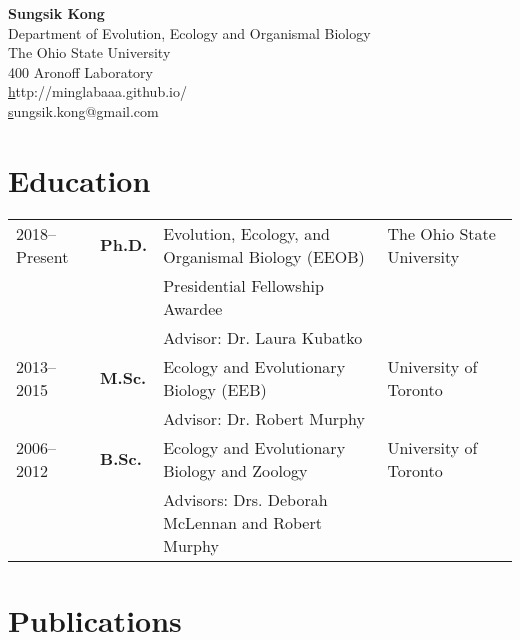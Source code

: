 \documentclass[11pt]{article}
\begin{document}
\pagestyle{plain}

\begin{center}
\huge \textbf{Sungsik Kong}\\
\vspace{0.2cm}
\large Department of Evolution, Ecology and Organismal Biology\\
\large The Ohio State University\\
\large 400 Aronoff Laboratory\\
\small \href{http://minglabaaa.github.io}http://minglabaaa.github.io/\\
\small \href{mailto:sungsik.kong@gmail.com}sungsik.kong@gmail.com
\end{center}




\hspace{0pt}




\section*{Education}

\begin{longtable}{p{}  p{} p{} p{}}
2018--Present & \textbf{Ph.D.} & Evolution, Ecology, and Organismal Biology (EEOB) & The Ohio State University\\
 & & Presidential Fellowship Awardee\\
 & & Advisor: Dr. Laura Kubatko\\
2013--2015 & \textbf{M.Sc.} & Ecology and Evolutionary Biology (EEB) & University of Toronto\\
 & & Advisor: Dr. Robert Murphy\\
2006--2012 & \textbf{B.Sc.} & Ecology and Evolutionary Biology and Zoology & University of Toronto\\
 & & Advisors: Drs. Deborah McLennan and Robert Murphy
\end{longtable}



\hspace{0pt}


\section*{Publications}
\end{document}
